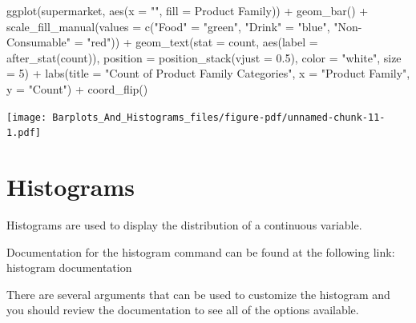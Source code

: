 \documentclass[
  letterpaper,
  DIV=11,
  numbers=noendperiod]{scrreprt}
\newenvironment{Shaded}{\begin{snugshade}}{\end{snugshade}}
\newcommand{\AttributeTok}[1]{\textcolor[rgb]{0.40,0.45,0.13}{#1}}
\newcommand{\DecValTok}[1]{\textcolor[rgb]{0.68,0.00,0.00}{#1}}
\newcommand{\FloatTok}[1]{\textcolor[rgb]{0.68,0.00,0.00}{#1}}
\newcommand{\FunctionTok}[1]{\textcolor[rgb]{0.28,0.35,0.67}{#1}}
\newcommand{\NormalTok}[1]{\textcolor[rgb]{0.00,0.23,0.31}{#1}}
\newcommand{\OtherTok}[1]{\textcolor[rgb]{0.00,0.23,0.31}{#1}}
\newcommand{\SpecialCharTok}[1]{\textcolor[rgb]{0.37,0.37,0.37}{#1}}
\newcommand{\StringTok}[1]{\textcolor[rgb]{0.13,0.47,0.30}{#1}}
\begin{document}
\begin{Shaded}
\begin{Highlighting}[]
\FunctionTok{ggplot}\NormalTok{(supermarket, }\FunctionTok{aes}\NormalTok{(}\AttributeTok{x =} \StringTok{""}\NormalTok{, }\AttributeTok{fill =} \StringTok{\textasciigrave{}}\AttributeTok{Product Family}\StringTok{\textasciigrave{}}\NormalTok{)) }\SpecialCharTok{+}
  \FunctionTok{geom\_bar}\NormalTok{() }\SpecialCharTok{+}
  \FunctionTok{scale\_fill\_manual}\NormalTok{(}\AttributeTok{values =} \FunctionTok{c}\NormalTok{(}\StringTok{"Food"} \OtherTok{=} \StringTok{"green"}\NormalTok{, }\StringTok{"Drink"} \OtherTok{=} \StringTok{"blue"}\NormalTok{, }\StringTok{"Non{-}Consumable"} \OtherTok{=} \StringTok{"red"}\NormalTok{)) }\SpecialCharTok{+}
  \FunctionTok{geom\_text}\NormalTok{(}\AttributeTok{stat =} \StringTok{\textquotesingle{}count\textquotesingle{}}\NormalTok{, }\FunctionTok{aes}\NormalTok{(}\AttributeTok{label =} \FunctionTok{after\_stat}\NormalTok{(count)), }\AttributeTok{position =} \FunctionTok{position\_stack}\NormalTok{(}\AttributeTok{vjust =} \FloatTok{0.5}\NormalTok{), }\AttributeTok{color =} \StringTok{"white"}\NormalTok{, }\AttributeTok{size =} \DecValTok{5}\NormalTok{) }\SpecialCharTok{+}
  \FunctionTok{labs}\NormalTok{(}\AttributeTok{title =} \StringTok{"Count of Product Family Categories"}\NormalTok{,}
       \AttributeTok{x =} \StringTok{"Product Family"}\NormalTok{,}
       \AttributeTok{y =} \StringTok{"Count"}\NormalTok{) }\SpecialCharTok{+}
  \FunctionTok{coord\_flip}\NormalTok{()}
\end{Highlighting}
\end{Shaded}

\texttt{[image: Barplots\_And\_Histograms\_files/figure-pdf/unnamed-chunk-11-1.pdf]}

\section*{Histograms}\label{histograms}


Histograms are used to display the distribution of a continuous
variable.

Documentation for the histogram command can be found at the following
link: histogram documentation

There are several arguments that can be used to customize the histogram
and you should review the documentation to see all of the options
available.
\end{document}
